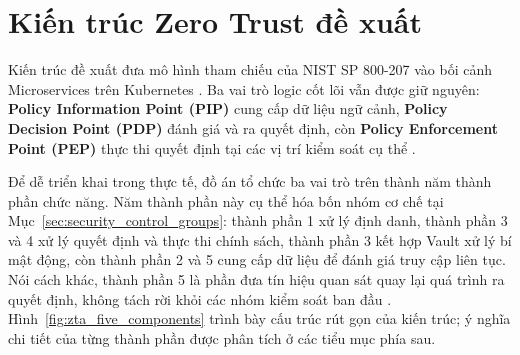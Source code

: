 \section{Kiến trúc Zero Trust đề xuất}
\label{sec:zta_proposed}

Kiến trúc đề xuất đưa mô hình tham chiếu của NIST SP 800-207 vào bối cảnh Microservices trên Kubernetes \parencite{nist800207}. Ba vai trò logic cốt lõi vẫn được giữ nguyên: \textbf{Policy Information Point (PIP)} cung cấp dữ liệu ngữ cảnh, \textbf{Policy Decision Point (PDP)} đánh giá và ra quyết định, còn \textbf{Policy Enforcement Point (PEP)} thực thi quyết định tại các vị trí kiểm soát cụ thể \parencite{nist800207,nist800204b_abac_microservices}.

Để dễ triển khai trong thực tế, đồ án tổ chức ba vai trò trên thành năm thành phần chức năng. Năm thành phần này cụ thể hóa bốn nhóm cơ chế tại Mục~\ref{sec:security_control_groups}: thành phần 1 xử lý định danh, thành phần 3 và 4 xử lý quyết định và thực thi chính sách, thành phần 3 kết hợp Vault xử lý bí mật động, còn thành phần 2 và 5 cung cấp dữ liệu để đánh giá truy cập liên tục. Nói cách khác, thành phần 5 là phần đưa tín hiệu quan sát quay lại quá trình ra quyết định, không tách rời khỏi các nhóm kiểm soát ban đầu \parencite{nist800204_microservices,nist800204c_devsecops_microservices}. Hình~\ref{fig:zta_five_components} trình bày cấu trúc rút gọn của kiến trúc; ý nghĩa chi tiết của từng thành phần được phân tích ở các tiểu mục phía sau.

